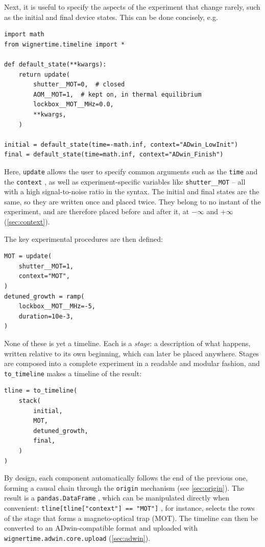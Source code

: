 \documentclass{SciPost}
\newcommand{\python}[1]{%
  \texttt{#1}%
}
\begin{document}
Next, it is useful to specify the aspects of the experiment that change rarely, such as the initial and final device states. This can be done concisely, e.g.
%
\begin{verbatim}
import math
from wignertime.timeline import *

def default_state(**kwargs):
    return update(
        shutter__MOT=0,  # closed
        AOM__MOT=1,  # kept on, in thermal equilibrium
        lockbox__MOT__MHz=0.0,
        **kwargs,
    )

initial = default_state(time=-math.inf, context="ADwin_LowInit")
final = default_state(time=math.inf, context="ADwin_Finish")
\end{verbatim}
%
Here, \python{update} allows the user to specify common arguments such as the \python{time} and the \python{context}, as well as experiment-specific variables like \python{shutter__MOT} – all with a high signal-to-noise ratio in the syntax. The initial and final states are the same, so they are written once and placed twice. They belong to no instant of the experiment, and are therefore placed before and after it, at $-\infty$ and $+\infty$ (\cref{sec:context}).

The key experimental procedures are then defined:
%
\begin{verbatim}
MOT = update(
    shutter__MOT=1,
    context="MOT",
)
detuned_growth = ramp(
    lockbox__MOT__MHz=-5,
    duration=10e-3,
)
\end{verbatim}
%
None of these is yet a timeline. Each is a \emph{stage}: a description of what happens, written relative to its own beginning, which can later be placed anywhere. Stages are composed into a complete experiment in a readable and modular fashion, and \python{to_timeline} makes a timeline of the result:
%
\begin{verbatim}
tline = to_timeline(
    stack(
        initial,
        MOT,
        detuned_growth,
        final,
    )
)
\end{verbatim}
%
By design, each component automatically follows the end of the previous one, forming a causal chain through the \python{origin} mechanism (see \cref{sec:origin}). The result is a \python{pandas.DataFrame}, which can be manipulated directly when convenient: \python{tline[tline["context"] == "MOT"]}, for instance, selects the rows of the stage that forms a magneto-optical trap (MOT). The timeline can then be converted to an ADwin-compatible format and uploaded with \python{wignertime.adwin.core.upload} (\cref{sec:adwin}).
 
\end{document}
